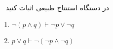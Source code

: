 ~
در دستگاه استنتاج طبیعی اثبات کنید
\begin{enumerate}
  \item $\neg (p \wedge q) \vdash \neg p \vee \neg q$
  \item $p \vee q \vdash \neg (\neg p \wedge \neg q)$
\end{enumerate}